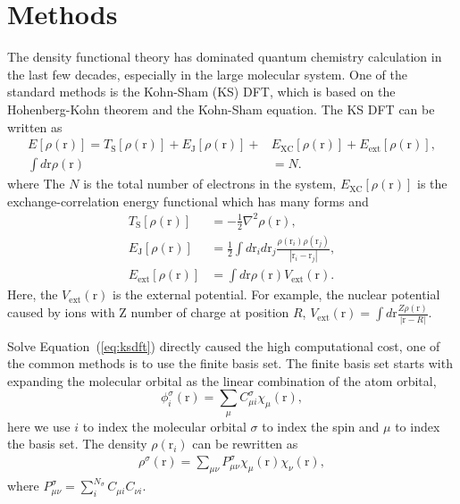 \documentclass[%
twocolumn,
amsmath,amssymb,
groupedaddress,
reprint,%
]{revtex4-2}
\newcommand{\tS}{\mathrm{S}}
\renewcommand{\>}{\rangle}
\newcommand{\<}{\langle}
\newcommand{\Eq}[1]{Equation \,(\ref{#1})}
\newcommand{\XC}{\mathrm{XC}}
\newcommand{\brm}[1]{\bm{\mathrm{#1}}}
\newcommand{\ext}{\mathrm{ext}}
\begin{document}
\section{Methods}
The density functional theory has dominated quantum chemistry calculation in the last few decades, especially in the large molecular system.
% 
One of the standard methods is the Kohn-Sham (KS) DFT, which is based on the Hohenberg-Kohn theorem and the Kohn-Sham equation.
% 
The KS DFT can be written as
\begin{subequations}
    \label{eq:ksdft}
    \begin{align}
        E[\rho(\brm{r})] = T_{\tS}[\rho(\brm{r})] + E_{\textrm{J}}[\rho(\brm{r})] + & E_{\XC}[\rho(\brm{r})] + E_{\ext}[\rho(\brm{r})], \\
        \int d \brm{r} \rho(\brm{r})                                                & = N.
    \end{align}
\end{subequations}
where
The $N$ is the total number of electrons in the system, $E_{\XC}[\rho(\brm{r})]$ is the exchange-correlation energy functional which has many forms and
\begin{subequations}
    \begin{align}
        T_{\tS}[\rho(\brm{r})]        & = -\frac{1}{2} \nabla^2 \rho(\brm{r}),                                                                                  \\
        E_{\textrm{J}}[\rho(\brm{r})] & = \frac{1}{2} \int d \brm{r}_{i} d \brm{r}_{j} \frac{\rho(\brm{r}_{i}) \rho(\brm{r}_{j})}{|\brm{r}_{i} - \brm{r}_{j}|}, \\
        E_{\ext}[\rho(\brm{r})]       & = \int d \brm{r} \rho(\brm{r}) V_{\ext}(\brm{r}).
    \end{align}
\end{subequations}
Here, the $V_{\ext}(\brm{r})$ is the external potential. For example, the nuclear potential caused by ions with Z number of charge at position $R$, $V_{\ext}(\brm{r}) = \int d \brm{r} \frac{Z \rho(\brm{r})}{|\brm{r}-R|}$.

Solve \Eq{eq:ksdft} directly caused the high computational cost, one of the common methods is to use the finite basis set.
% 
The finite basis set starts with expanding the molecular orbital as the linear combination of the atom orbital,
\begin{equation}
    \phi^{\sigma}_i(\brm{r}) = \sum_{\mu} C^{\sigma}_{\mu i} \chi_{\mu}(\brm{r}),
\end{equation}
here we use $i$ to index the molecular orbital $\sigma$ to index the spin and $\mu$ to index the basis set.
% 
The density $\rho(\brm{r}_{i})$ can be rewritten as
\begin{equation}
    \begin{aligned}
        \rho^{\sigma}(\brm{r}) = \sum_{\mu \nu} P^{\sigma}_{\mu \nu} \chi_{\mu}(\brm{r}) \chi_{\nu}(\brm{r}),
    \end{aligned}
\end{equation}
where $P^{\sigma}_{\mu \nu} = \sum_{i}^{N_{\sigma}} C_{\mu i} C_{\nu i}$.
\end{document}
